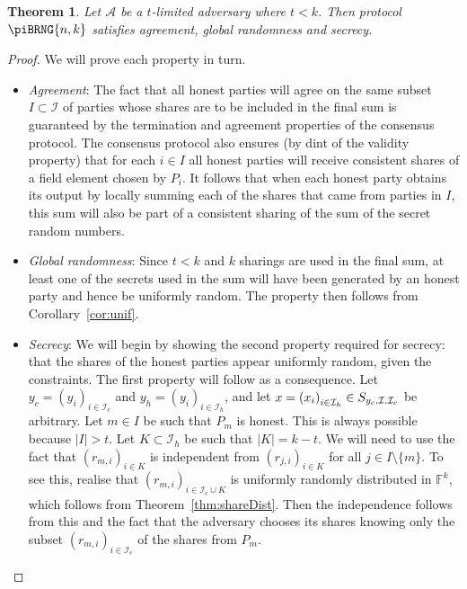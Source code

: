 \documentclass{article}
\newtheorem{theorem}{Theorem}
\theoremstyle{remark}
\newcommand{\F}{\mathbb{F}}
\begin{document}
\begin{theorem}
	Let $\mathcal{A}$ be a $t$-limited adversary where $t < k$. Then protocol
	$\piBRNG{n,k}$ satisfies agreement, global randomness and secrecy.
\end{theorem}

\begin{proof}
	We will prove each property in turn.

	\begin{itemize}
		\item \textit{Agreement}: The fact that all honest parties will agree
			on the same subset $I \subset \mathcal{I}$ of parties whose shares
			are to be included in the final sum is guaranteed by the
			termination and agreement properties of the consensus protocol. The
			consensus protocol also ensures (by dint of the validity property)
			that for each $i \in I$ all honest parties will receive consistent
			shares of a field element chosen by $P_i$. It follows that when
			each honest party obtains its output by locally summing each of the
			shares that came from parties in $I$, this sum will also be part of
			a consistent sharing of the sum of the secret random numbers.

		\item \textit{Global randomness}: Since $t < k$ and $k$ sharings are
			used in the final sum, at least one of the secrets used in the sum
			will have been generated by an honest party and hence be uniformly
			random. The property then follows from Corollary~\ref{cor:unif}.

		\item \textit{Secrecy}: We will begin by showing the second property
			required for secrecy: that the shares of the honest parties appear
			uniformly random, given the constraints. The first property will
			follow as a consequence. Let
			$y_c = {(y_i)}_{i \in \mathcal{I}_c}$
			and
			$y_h = {(y_i)}_{i \in \mathcal{I}_h}$,
			and let
			$x = {(x_i)}_{i \in \mathcal{I}_h}
			\in
			S_{y_c, \mathcal{I}, \mathcal{I}_c}$
			be arbitrary. Let $m \in I$ be such that $P_m$ is honest. This is
			always possible because $|I| > t$. Let
			$K \subset \mathcal{I}_h$
			be such that $|K| = k - t$. We will need to use the fact that
			${(r_{m, i})}_{i \in K}$
			is independent from
			${(r_{j, i})}_{i \in K}$
			for all $j \in I \setminus \{m\}$. To see this, realise that
			${(r_{m, i})}_{i \in \mathcal{I}_c \cup K}$
			is uniformly randomly distributed in $\F^k$, which follows
			from Theorem~\ref{thm:shareDist}. Then the independence follows
			from this and the fact that the adversary chooses its shares
			knowing only the subset
			${(r_{m, i})}_{i \in \mathcal{I}_c}$
			of the shares from $P_m$.


\end{itemize}
\end{proof}
\end{document}
